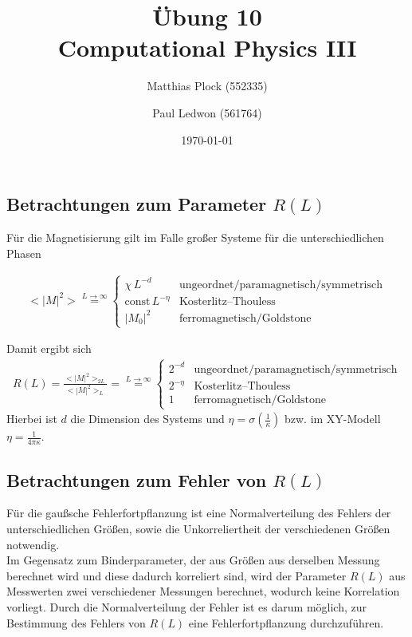 \documentclass[10pt,a4paper]{article}
\title{Übung 10 \\Computational Physics III}
\author{Matthias Plock (552335) \and Paul Ledwon (561764)} %
\date{\today}
\begin{document}
\maketitle
\tableofcontents

\pagestyle{myheadings}                  %

\subsection{Betrachtungen zum Parameter $R(L)$}

Für die Magnetisierung gilt im Falle großer Systeme für die unterschiedlichen
Phasen

\begin{align*}
<|M|^2>\overset{L\to\infty}{=}
\begin{cases}
\chi\, L^{-d} &  \text{ungeordnet/paramagnetisch/symmetrisch}\\
\text{const}\, L^{-\eta} & \text{Kosterlitz–Thouless} \\
|M_0|^2 & \text{ferromagnetisch/Goldstone}
\end{cases}
\end{align*}

Damit ergibt sich
\begin{align*}
R(L)=\frac{<|M|^2>_{2L}}{<|M|^2>_{L}}=\overset{L\to\infty}{=}
\begin{cases}
 2^{-d}&  \text{ungeordnet/paramagnetisch/symmetrisch}\\
 2^{-\eta}& \text{Kosterlitz–Thouless} \\
1 & \text{ferromagnetisch/Goldstone}
\end{cases}
\end{align*}
Hierbei ist $d$ die Dimension des Systems und $\eta=\sigma(\frac{1}{\kappa})$
bzw. im XY-Modell $\eta=\frac{1}{4 \pi \kappa}$.

\subsection{Betrachtungen zum Fehler von $R(L)$}

Für die gaußsche Fehlerfortpflanzung ist eine Normalverteilung des Fehlers
der unterschiedlichen Größen, sowie die Unkorreliertheit der verschiedenen
Größen notwendig.\\
Im Gegensatz zum Binderparameter, der aus Größen aus derselben Messung
berechnet wird und diese dadurch korreliert sind, wird der Parameter $R(L)$
aus Messwerten zwei verschiedener Messungen berechnet, wodurch keine
Korrelation vorliegt. Durch die Normalverteilung der Fehler ist es darum
möglich, zur Bestimmung des Fehlers von $R(L)$ eine Fehlerfortpflanzung
durchzuführen.
\end{document}
